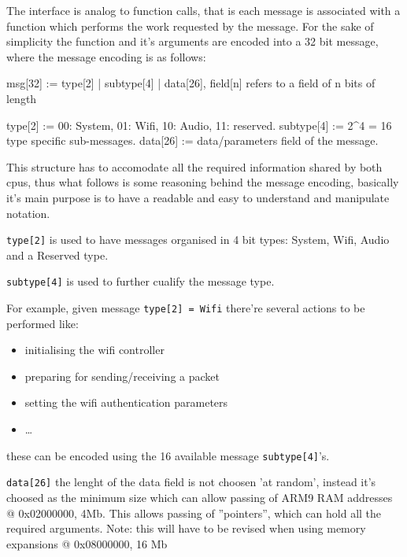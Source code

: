 \documentclass[11pt]{p9article}
\begin{document}
The interface is analog to function calls, that is each message is associated
with a function which performs the work requested by the message.
For the sake of simplicity the function and it's arguments are encoded 
into a 32 bit message, where the message encoding is as follows:

\begin{center}
\begin{boxedverbatim}
	msg[32] := type[2] | subtype[4] | data[26],
	field[n] refers to a field of n bits of length
		
	type[2] := 00: System, 01: Wifi, 10: Audio, 11: reserved.
	subtype[4] := 2^4 = 16 type specific sub-messages.
	data[26] := data/parameters field of the message.
\end{boxedverbatim}
\end{center}
		
This structure has to accomodate all the required information shared by both cpus,
thus what follows is some reasoning behind the message encoding, basically it's main
purpose is to have a readable and easy to understand and manipulate notation.

\begin{description}
\item \verb+type[2]+
is used to have messages organised in 4 bit types: System, Wifi, Audio and a Reserved type.

\item \verb+subtype[4]+
is used to further cualify the message type.

For example, given message \verb+type[2] = Wifi+ there're several actions to be performed like:
\begin{itemize}
	\item initialising the wifi controller
	\item preparing for sending/receiving a packet
	\item setting the wifi authentication parameters
	\item \ldots
\end{itemize}
these can be encoded using the 16 available message \verb+subtype[4]+'s.

\item \verb+data[26]+
the lenght of the data field is not choosen 'at random', instead it's choosed
as the minimum size which can allow passing of ARM9 RAM addresses @ 0x02000000, 4Mb.
This allows passing of ''pointers'', which can hold all the required arguments.
Note: this will have to be revised when using memory expansions @ 0x08000000, 16 Mb	
\end{description}
	
\end{document}
